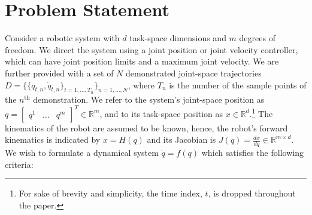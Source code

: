 \documentclass[letterpaper, 10 pt, conference,fleqn]{ieeeconf}
\begin{document}
\section{Problem Statement} \label{Sec:Prob}
Consider a robotic system with $d$ task-space dimensions and $m$ degrees of freedom. We direct the system using a joint position or joint velocity controller, which can have joint position limits and a maximum joint velocity. We are further provided with a set of $N$ demonstrated joint-space trajectories $D=\{\{q_{t,n},\dot{q}_{t,n}\}_{t=1,\dots, T_n}\}_{n=1,\dots,N}$, where $T_n$ is the number of the sample points of the $n^{\text{th}}$ demonstration. We refer to the system's joint-space position as $q=\begin{bmatrix} q^1 & \dots & q^m
\end{bmatrix}^T \in \mathbb{R}^m$, and to its task-space position as $x\in \mathbb{R}^d$.\footnote{For sake of brevity and simplicity, the time index, $t$, is dropped throughout the paper. } The kinematics of the robot are assumed to be known, hence, the robot's forward kinematics is indicated by $x = H(q)$ and its Jacobian is $J(q) = \frac{dx}{dq}\in \mathbb{R}^{m\times d}$.\\
We wish to formulate a dynamical system $\dot{q} = f(q)$ which satisfies the following criteria:
\renewcommand{\labelenumi}{(\Roman{enumi})}
\end{document}
